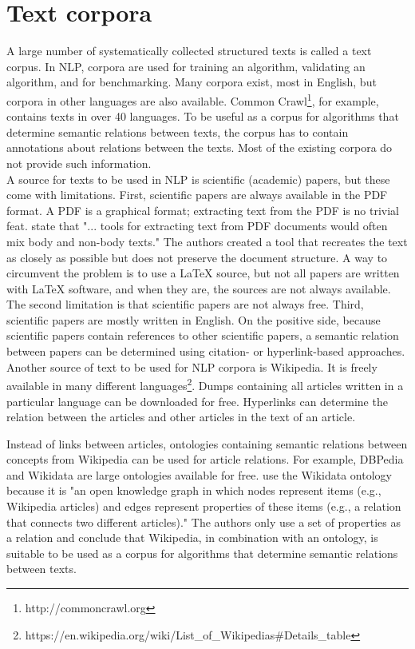 \section{Text corpora}

A large number of systematically collected structured texts is called a text corpus. In NLP, corpora are used for training an algorithm, validating an algorithm, and for benchmarking. Many corpora exist, most in English, but corpora in other languages are also available. Common Crawl\footnote{http://commoncrawl.org}, for example, contains texts in over 40 languages. To be useful as a corpus for algorithms that determine semantic relations between texts, the corpus has to contain annotations about relations between the texts. Most of the existing corpora do not provide such information.\\

A source for texts to be used in NLP is scientific (academic) papers, but these come with limitations. First, scientific papers are always available in the PDF format. A PDF is a graphical format; extracting text from the PDF is no trivial feat. \citet{kdir20} state that "... tools for extracting text from PDF documents would often mix body and non-body texts." The authors created a tool that recreates the text as closely as possible but does not preserve the document structure. A way to circumvent the problem is to use a LaTeX source, but not all papers are written with LaTeX software, and when they are, the sources are not always available. The second limitation is that scientific papers are not always free. Third, scientific papers are mostly written in English. On the positive side, because scientific papers contain references to other scientific papers, a semantic relation between papers can be determined using citation- or hyperlink-based approaches.\\

Another source of text to be used for NLP corpora is Wikipedia. It is freely available in many different languages\footnote{https://en.wikipedia.org/wiki/List\_of\_Wikipedias\#Details\_table}. Dumps containing all articles written in a particular language can be downloaded for free. Hyperlinks can determine the relation between the articles and other articles in the text of an article.

Instead of links between articles, ontologies containing semantic relations between concepts from Wikipedia can be used for article relations. For example, DBPedia \citep{BIZER2009154} and Wikidata \citep{vrandevcic2014Wikidata} are large ontologies available for free. \citet{ostendorff2020pairwise} use the Wikidata ontology because it is "an open knowledge graph in which nodes represent items (e.g., Wikipedia articles) and edges represent properties of these items (e.g., a relation that connects two different articles)." The authors only use a set of properties as a relation and conclude that Wikipedia, in combination with an ontology, is suitable to be used as a corpus for algorithms that determine semantic relations between texts.\\

